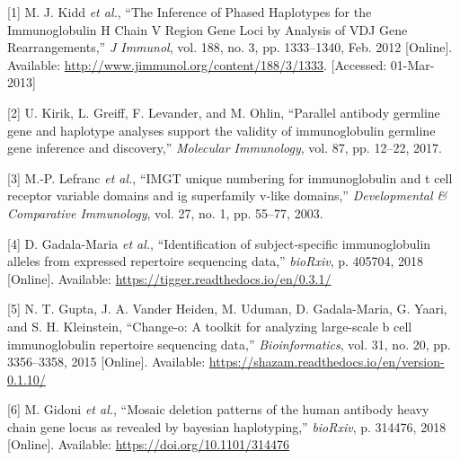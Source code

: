 \documentclass[11pt,]{article}
\begin{document}
\hypertarget{refs}{}
\hypertarget{ref-kidd_inference_2012}{}
{[}1{]} M. J. Kidd \emph{et al.}, ``The Inference of Phased Haplotypes
for the Immunoglobulin H Chain V Region Gene Loci by Analysis of VDJ
Gene Rearrangements,'' \emph{J Immunol}, vol. 188, no. 3, pp.
1333--1340, Feb. 2012 {[}Online{]}. Available:
\url{http://www.jimmunol.org/content/188/3/1333}. {[}Accessed:
01-Mar-2013{]}

\hypertarget{ref-kirik2017parallel}{}
{[}2{]} U. Kirik, L. Greiff, F. Levander, and M. Ohlin, ``Parallel
antibody germline gene and haplotype analyses support the validity of
immunoglobulin germline gene inference and discovery,'' \emph{Molecular
Immunology}, vol. 87, pp. 12--22, 2017.

\hypertarget{ref-lefranc2003imgt}{}
{[}3{]} M.-P. Lefranc \emph{et al.}, ``IMGT unique numbering for
immunoglobulin and t cell receptor variable domains and ig superfamily
v-like domains,'' \emph{Developmental \& Comparative Immunology}, vol.
27, no. 1, pp. 55--77, 2003.

\hypertarget{ref-gadala2018identification}{}
{[}4{]} D. Gadala-Maria \emph{et al.}, ``Identification of
subject-specific immunoglobulin alleles from expressed repertoire
sequencing data,'' \emph{bioRxiv}, p. 405704, 2018 {[}Online{]}.
Available: \url{https://tigger.readthedocs.io/en/0.3.1/}

\hypertarget{ref-gupta2015change}{}
{[}5{]} N. T. Gupta, J. A. Vander Heiden, M. Uduman, D. Gadala-Maria, G.
Yaari, and S. H. Kleinstein, ``Change-o: A toolkit for analyzing
large-scale b cell immunoglobulin repertoire sequencing data,''
\emph{Bioinformatics}, vol. 31, no. 20, pp. 3356--3358, 2015
{[}Online{]}. Available:
\url{https://shazam.readthedocs.io/en/version-0.1.10/}

\hypertarget{ref-gidoni2018mosaic}{}
{[}6{]} M. Gidoni \emph{et al.}, ``Mosaic deletion patterns of the human
antibody heavy chain gene locus as revealed by bayesian haplotyping,''
\emph{bioRxiv}, p. 314476, 2018 {[}Online{]}. Available:
\url{https://doi.org/10.1101/314476}
\end{document}
